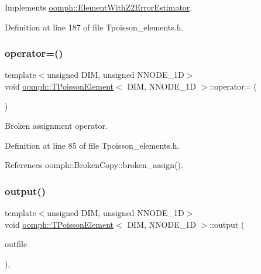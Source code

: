 Implements \hyperlink{classoomph_1_1ElementWithZ2ErrorEstimator_a19495a0e77ef4ff35f15fdf7913b4077}{oomph\+::\+Element\+With\+Z2\+Error\+Estimator}.



Definition at line 187 of file Tpoisson\+\_\+elements.\+h.

\mbox{\label{classoomph_1_1TPoissonElement_a97c2a982c586228f55d44ba2ecdb08a4}} 
\subsubsection{\texorpdfstring{operator=()}{operator=()}}
{\footnotesize\ttfamily template$<$unsigned D\+IM, unsigned N\+N\+O\+D\+E\+\_\+1D$>$ \\
void \hyperlink{classoomph_1_1TPoissonElement}{oomph\+::\+T\+Poisson\+Element}$<$ D\+IM, N\+N\+O\+D\+E\+\_\+1D $>$\+::operator= (\begin{DoxyParamCaption}\item[{const \hyperlink{classoomph_1_1TPoissonElement}{T\+Poisson\+Element}$<$ D\+IM, N\+N\+O\+D\+E\+\_\+1D $>$ \&}]{ }\end{DoxyParamCaption})\hspace{0.3cm}{\ttfamily [inline]}}



Broken assignment operator. 



Definition at line 85 of file Tpoisson\+\_\+elements.\+h.



References oomph\+::\+Broken\+Copy\+::broken\+\_\+assign().

\mbox{\label{classoomph_1_1TPoissonElement_a44da26efce008c0c7c986f9277cd3302}} 
\subsubsection{\texorpdfstring{output()}{output()}\hspace{0.1cm}{\footnotesize\ttfamily [1/4]}}
{\footnotesize\ttfamily template$<$unsigned D\+IM, unsigned N\+N\+O\+D\+E\+\_\+1D$>$ \\
void \hyperlink{classoomph_1_1TPoissonElement}{oomph\+::\+T\+Poisson\+Element}$<$ D\+IM, N\+N\+O\+D\+E\+\_\+1D $>$\+::output (\begin{DoxyParamCaption}\item[{std\+::ostream \&}]{outfile }\end{DoxyParamCaption})\hspace{0.3cm}{\ttfamily [inline]}, {\ttfamily [virtual]}}




